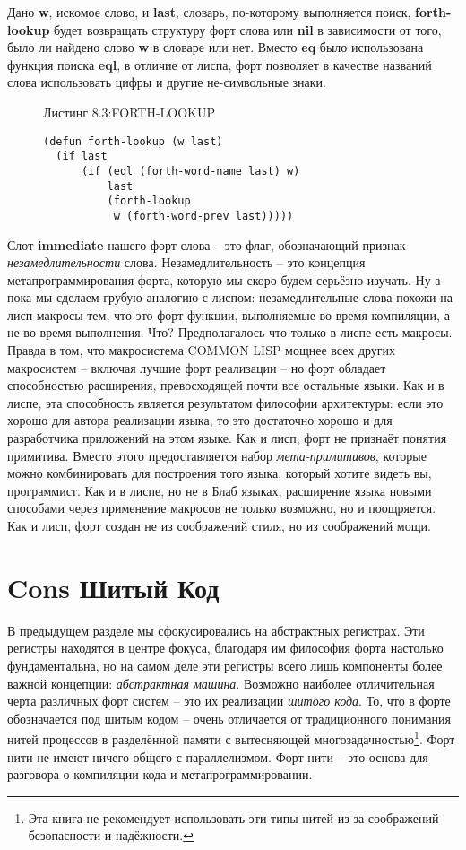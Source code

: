 Дано \textbf{w}, искомое слово, и \textbf{last}, словарь, по-которому выполняется поиск, \textbf{forth-lookup} будет возвращать структуру форт слова или \textbf{nil} в зависимости от того, было ли найдено слово \textbf{w} в словаре или нет. Вместо \textbf{eq} было использована функция поиска \textbf{eql}, в отличие от лиспа, форт позволяет в качестве названий слова использовать цифры и другие не-символьные знаки.

\begin{figure}Листинг 8.3:FORTH-LOOKUP\label{listing_8.3}
\listbegin
\begin{verbatim}
(defun forth-lookup (w last)
  (if last
      (if (eql (forth-word-name last) w)
          last
          (forth-lookup
           w (forth-word-prev last)))))
\end{verbatim}
  \listend
\end{figure}

Слот \textbf{immediate} нашего форт слова -- это флаг, обозначающий признак \emph{незамедлительности} слова. Незамедлительность -- это концепция метапрограммирования форта, которую мы скоро будем серьёзно изучать. Ну а пока мы сделаем грубую аналогию с лиспом: незамедлительные слова похожи на лисп макросы тем, что это форт функции, выполняемые во время компиляции, а не во время выполнения. Что? Предполагалось что только в лиспе есть макросы. Правда в том, что макросистема COMMON LISP мощнее всех других макросистем -- включая лучшие форт реализации -- но форт обладает способностью расширения, превосходящей почти все остальные языки. Как и в лиспе, эта способность является результатом философии архитектуры: если это хорошо для автора реализации языка, то это достаточно хорошо и для разработчика приложений на этом языке. Как и лисп, форт не признаёт понятия примитива. Вместо этого предоставляется набор \emph{мета-примитивов}, которые можно комбинировать для построения того языка, который хотите видеть вы, программист. Как и в лиспе, но не в Блаб языках, расширение языка новыми способами через применение макросов не только возможно, но и поощряется. Как и лисп, форт создан не из соображений стиля, но из соображений мощи.

\section{Cons Шитый Код}\label{section_cons_threaded_code}

В предыдущем разделе мы сфокусировались на абстрактных регистрах. Эти регистры находятся в центре фокуса, благодаря им философия форта настолько фундаментальна, но на самом деле эти регистры всего лишь компоненты более важной концепции: \emph{абстрактная машина}. Возможно наиболее отличительная черта различных форт систем -- это их реализации \emph{шитого кода}. То, что в форте обозначается под шитым кодом -- очень отличается от традиционного понимания нитей процессов в разделённой памяти с вытесняющей многозадачностью\footnote{Эта книга не рекомендует использовать эти типы нитей  из-за соображений безопасности и надёжности.}. Форт нити не имеют ничего общего с параллелизмом. Форт нити -- это основа для разговора о компиляции кода и метапрограммировании.


